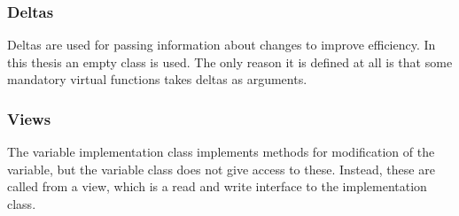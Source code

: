 \documentclass[a4paper,11pt]{article}
\begin{document}
\subsubsection{Deltas}
Deltas are used for passing information about changes to improve efficiency. In this thesis an empty class is used. The only reason it is defined at all is that some mandatory virtual functions takes deltas as arguments.

\subsubsection{Views}
The variable implementation class implements methods for modification of the variable, but the variable class does not give access to these. Instead, these are called from a view, which is a read and write interface to the implementation class.
\end{document}

